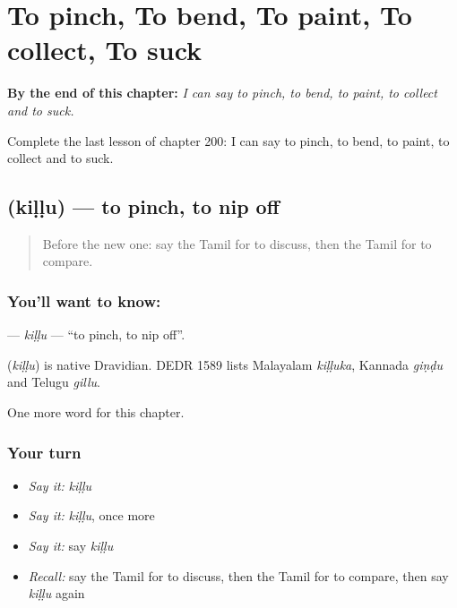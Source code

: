 
\chapter{To pinch, To bend, To paint, To collect, To suck}
\label{ch:ta-to-pinch-to-bend-to-paint-to-collect-to-suck}

\begin{chapteropening}
\textbf{By the end of this chapter:} \emph{I can say to pinch, to bend, to paint, to collect and to suck.}

Complete the last lesson of chapter 200: I can say to pinch, to bend, to paint, to collect and to suck.
\end{chapteropening}

\section[\texorpdfstring{\ta{கிள்ளு} (kiḷḷu)}{கிள்ளு (kiḷḷu)}]{ (kiḷḷu) — to pinch, to nip off}

\label{lesson:TA-C200-killu}



\begin{quote}
Before the new one: say the Tamil for to discuss, then the Tamil for to compare.
\end{quote}

\subsection*{You'll want to know: }
\textbf{} — \emph{kiḷḷu} — \textquotedblleft{}to pinch, to nip off\textquotedblright{}.

\begin{cousinweb}
\textbf{} (\emph{kiḷḷu}) is native Dravidian. DEDR 1589 lists Malayalam \emph{kiḷḷuka}, Kannada \emph{giṇḍu} and Telugu \emph{gillu}.
\end{cousinweb}

\begin{grammarlens}[title={What you've built}]
One more word for this chapter.
\end{grammarlens}

\subsection*{Your turn}
\begin{itemize}
\raggedright
  \item \emph{Say it:} \emph{kiḷḷu}
  \item \emph{Say it:} \emph{kiḷḷu}, once more
  \item \emph{Say it:} say \emph{kiḷḷu}
  \item \emph{Recall:} say the Tamil for to discuss, then the Tamil for to compare, then say \emph{kiḷḷu} again
\end{itemize}

